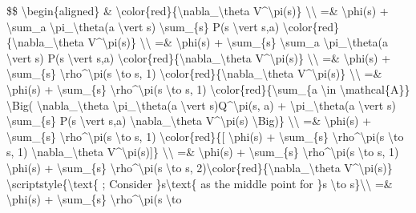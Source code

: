 \$\$ \textbackslash begin\{aligned\} \& \textbackslash color\{red\}\{\textbackslash nabla\_\textbackslash theta V\^{}\textbackslash pi(s)\} \textbackslash\textbackslash{} =\& \textbackslash phi(s) + \textbackslash sum\_a \textbackslash pi\_\textbackslash theta(a \textbackslash vert s) \textbackslash sum\_\{s\textquotesingle\} P(s\textquotesingle{} \textbackslash vert s,a) \textbackslash color\{red\}\{\textbackslash nabla\_\textbackslash theta V\^{}\textbackslash pi(s\textquotesingle)\} \textbackslash\textbackslash{} =\& \textbackslash phi(s) + \textbackslash sum\_\{s\textquotesingle\} \textbackslash sum\_a \textbackslash pi\_\textbackslash theta(a \textbackslash vert s) P(s\textquotesingle{} \textbackslash vert s,a) \textbackslash color\{red\}\{\textbackslash nabla\_\textbackslash theta V\^{}\textbackslash pi(s\textquotesingle)\} \textbackslash\textbackslash{} =\& \textbackslash phi(s) + \textbackslash sum\_\{s\textquotesingle\} \textbackslash rho\^{}\textbackslash pi(s \textbackslash to s\textquotesingle, 1) \textbackslash color\{red\}\{\textbackslash nabla\_\textbackslash theta V\^{}\textbackslash pi(s\textquotesingle)\} \textbackslash\textbackslash{} =\& \textbackslash phi(s) + \textbackslash sum\_\{s\textquotesingle\} \textbackslash rho\^{}\textbackslash pi(s \textbackslash to s\textquotesingle, 1) \textbackslash color\{red\}\{\textbackslash sum\_\{a \textbackslash in \textbackslash mathcal\{A\}\} \textbackslash Big( \textbackslash nabla\_\textbackslash theta \textbackslash pi\_\textbackslash theta(a \textbackslash vert s\textquotesingle)Q\^{}\textbackslash pi(s\textquotesingle, a) + \textbackslash pi\_\textbackslash theta(a \textbackslash vert s\textquotesingle) \textbackslash sum\_\{s\textquotesingle\} P(s\textquotesingle\textquotesingle{} \textbackslash vert s\textquotesingle,a) \textbackslash nabla\_\textbackslash theta V\^{}\textbackslash pi(s\textquotesingle\textquotesingle) \textbackslash Big)\} \textbackslash\textbackslash{} =\& \textbackslash phi(s) + \textbackslash sum\_\{s\textquotesingle\} \textbackslash rho\^{}\textbackslash pi(s \textbackslash to s\textquotesingle, 1) \textbackslash color\{red\}\{{[} \textbackslash phi(s\textquotesingle) + \textbackslash sum\_\{s\textquotesingle\textquotesingle\} \textbackslash rho\^{}\textbackslash pi(s\textquotesingle{} \textbackslash to s\textquotesingle\textquotesingle, 1) \textbackslash nabla\_\textbackslash theta V\^{}\textbackslash pi(s\textquotesingle\textquotesingle){]}\} \textbackslash\textbackslash{} =\& \textbackslash phi(s) + \textbackslash sum\_\{s\textquotesingle\} \textbackslash rho\^{}\textbackslash pi(s \textbackslash to s\textquotesingle, 1) \textbackslash phi(s\textquotesingle) + \textbackslash sum\_\{s\textquotesingle\textquotesingle\} \textbackslash rho\^{}\textbackslash pi(s \textbackslash to s\textquotesingle\textquotesingle, 2)\textbackslash color\{red\}\{\textbackslash nabla\_\textbackslash theta V\^{}\textbackslash pi(s\textquotesingle\textquotesingle)\} \textbackslash scriptstyle\{\textbackslash text\{ ; Consider \}s\textquotesingle\textbackslash text\{ as the middle point for \}s \textbackslash to s\textquotesingle\textquotesingle\}\textbackslash\textbackslash{} =\& \textbackslash phi(s) + \textbackslash sum\_\{s\textquotesingle\} \textbackslash rho\^{}\textbackslash pi(s \textbackslash to 